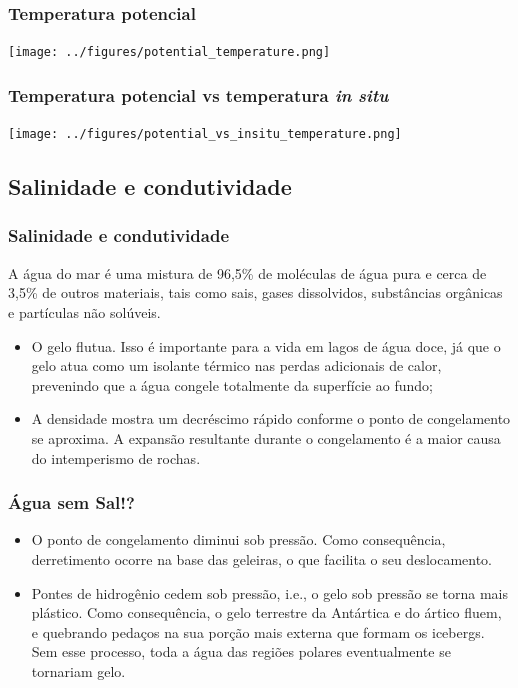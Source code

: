 \begin{frame}
\frametitle{Temperatura potencial}
    \begin{center}
        \texttt{[image: ../figures/potential\_temperature.png]}
    \end{center}
\end{frame}

\begin{frame}
\frametitle{Temperatura potencial vs temperatura {\it in situ}}
    \begin{center}
        \texttt{[image: ../figures/potential\_vs\_insitu\_temperature.png]}
    \end{center}
\end{frame}

\subsection{Salinidade e condutividade}
\begin{frame}
\frametitle{Salinidade e condutividade}
    \begin{block}{}
        A água do mar é uma mistura de 96,5\% de moléculas de água pura e cerca
        de 3,5\% de outros materiais, tais como sais, gases dissolvidos,
        substâncias orgânicas e partículas não solúveis.
    \end{block}
    \small{
    \begin{itemize}[<+-| alert@+>]
    \item O gelo flutua. Isso é importante para a vida em lagos de água doce,
    já que o gelo atua como um isolante térmico nas perdas adicionais de calor,
    prevenindo que a água congele totalmente da superfície ao fundo;
    \item A densidade mostra um decréscimo rápido conforme o ponto de
    congelamento se aproxima. A expansão resultante durante o congelamento é a
    maior causa do intemperismo de rochas.
    \end{itemize}
    }
\end{frame}

\begin{frame}
\frametitle{Água sem Sal!?}
    \small{
    \begin{itemize}[<+-| alert@+>]
    \item O ponto de congelamento diminui sob pressão. Como consequência,
    derretimento ocorre na base das geleiras, o que facilita o seu deslocamento.
    \item Pontes de hidrogênio cedem sob pressão, i.e., o gelo sob pressão se
    torna mais plástico. Como consequência, o gelo terrestre da Antártica e do
    ártico fluem, e quebrando pedaços na sua porção mais externa que formam os
    icebergs. Sem esse processo, toda a água das regiões polares eventualmente se
    tornariam gelo.
    \end{itemize}
    }
\end{frame}

